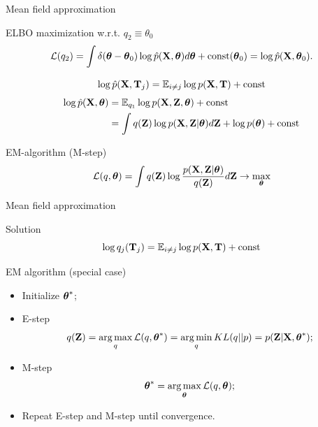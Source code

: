 \begin{frame}{Mean field approximation}
	
	\begin{block}{ELBO maximization w.r.t. $q_2 \equiv \theta_0$}
		\vspace{-0.3cm}
		\[
			\mathcal{L} (q_2) = \int \delta(\boldsymbol{\theta} - \boldsymbol{\theta}_0) \log \hat{p}(\mathbf{X}, \boldsymbol{\theta}) d\boldsymbol{\theta} + \text{const}(\boldsymbol{\theta}_0) = \log \hat{p}(\mathbf{X}, \boldsymbol{\theta}_0).
		\]
	\end{block}
	\vspace{-0.3cm}
	\[
		\log \hat{p}(\mathbf{X}, \mathbf{T}_j) = \mathbb{E}_{i \neq j} \log p(\mathbf{X}, \mathbf{T}) + \text{const}
	\]
	\begin{align*}
		\log \hat{p}(\mathbf{X}, \boldsymbol{\theta}) &= \mathbb{E}_{q_1} \log p(\mathbf{X}, \mathbf{Z}, \boldsymbol{\theta}) + \text{const} \\
		&= \int q(\mathbf{Z}) \log p(\mathbf{X}, \mathbf{Z}|  \boldsymbol{\theta}) d\mathbf{Z} + \log p(\boldsymbol{\theta})+ \text{const}
	\end{align*}
	\vspace{-0.3cm}
	\begin{block}{EM-algorithm (M-step)}
		 \[
		 	\mathcal{L}(q, \boldsymbol{\theta}) =	\int q(\mathbf{Z}) \log \frac{p(\mathbf{X}, \mathbf{Z} | \boldsymbol{\theta})}{q(\mathbf{Z})}d\mathbf{Z} \rightarrow \max_{\boldsymbol{\theta}}
		 \]
	\end{block}
\end{frame}
\begin{frame}{Mean field approximation}
    \begin{block}{Solution}
    \[
        \log q_j(\mathbf{T}_j) = \mathbb{E}_{i \neq j} \log p(\mathbf{X}, \mathbf{T}) + \text{const}
    \]
    \end{block}

	\begin{block}{EM algorithm (special case)}
	\begin{itemize}
		\item Initialize $\boldsymbol{\theta}^*$;
		\item E-step
		\[
			q(\mathbf{Z}) = \operatorname*{arg\,max}_q \mathcal{L} (q, \boldsymbol{\theta}^*) = \operatorname*{arg\,min}_q KL(q || p) =
			 p(\mathbf{Z}| \mathbf{X}, \boldsymbol{\theta}^*);
		\]
		\item M-step
		\[
			\boldsymbol{\theta}^* = \operatorname*{arg\,max}_{\boldsymbol{\theta}} \mathcal{L} (q, \boldsymbol{\theta});
		\]
		\item Repeat E-step and M-step until convergence.
	\end{itemize}
	\end{block}
\end{frame}
